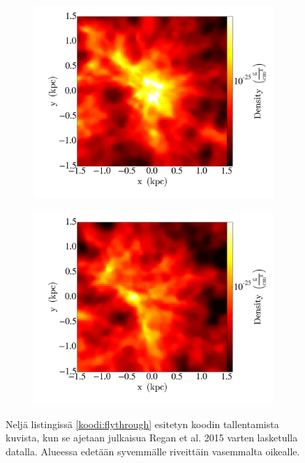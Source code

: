 \documentclass[12pt,a4paper]{article}
\begin{document}
\begin{figure}
\begin{subfigure}[b]{0.48\textwidth}
   \end{subfigure}
   \begin{subfigure}[b]{0.48\textwidth}
       \includegraphics[width=\textwidth]{../kuvat/flythrough/0066.png}
   \end{subfigure}
   \begin{subfigure}[b]{0.48\textwidth}
       \includegraphics[width=\textwidth]{../kuvat/flythrough/0099.png}
   \end{subfigure}
   \caption{Neljä listingissä \ref{koodi:flythrough} esitetyn koodin tallentamista kuvista, kun se ajetaan julkaisua Regan et al. 2015 varten lasketulla datalla. Alueessa edetään syvemmälle riveittäin vasemmalta oikealle.}\label{fig:flythrough}
\end{figure}
\end{document}
